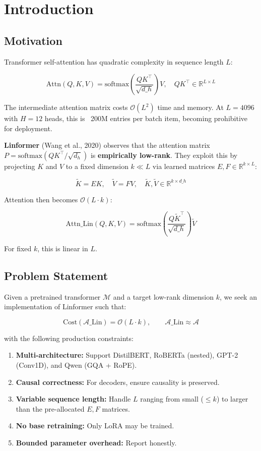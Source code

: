 \section{Introduction}

\subsection{Motivation}

Transformer self-attention has quadratic complexity in sequence length $L$:

\[
\text{Attn}(Q, K, V) = \text{softmax}\!\left(\frac{Q K^\top}{\sqrt{d\_h}}\right) V, 
\quad QK^\top \in \mathbb{R}^{L \times L}
\tag{1.1}
\]

The intermediate attention matrix costs $\mathcal{O}(L^2)$ time and memory. 
At $L = 4096$ with $H = 12$ heads, this is ~200M entries per batch item, 
becoming prohibitive for deployment.

\textbf{Linformer} (Wang et al., 2020) observes that the attention matrix 
$P = \text{softmax}(QK^\top/\sqrt{d_h})$ is \textbf{empirically low-rank}. They 
exploit this by projecting $K$ and $V$ to a fixed dimension $k \ll L$ via 
learned matrices $E, F \in \mathbb{R}^{k \times L}$:

\[
\tilde{K} = E K, \quad \tilde{V} = F V, \quad \tilde{K}, \tilde{V} \in \mathbb{R}^{k \times d\_h}
\tag{1.2}
\]

Attention then becomes $\mathcal{O}(L \cdot k)$:

\[
\text{Attn}\_\text{Lin}(Q, K, V) = \text{softmax}\!\left(\frac{Q \tilde{K}^\top}{\sqrt{d\_h}}\right) \tilde{V}
\tag{1.3}
\]

For fixed $k$, this is linear in $L$.

\subsection{Problem Statement}

Given a pretrained transformer $\mathcal{M}$ and a target low-rank dimension 
$k$, we seek an implementation of Linformer such that:

\[
\text{Cost}(\mathcal{A}\_\text{Lin}) = \mathcal{O}(L \cdot k), \qquad
\mathcal{A}\_\text{Lin} \approx \mathcal{A}
\tag{1.4}
\]

with the following production constraints:

\begin{enumerate}
\item \textbf{Multi-architecture:} Support DistilBERT, RoBERTa (nested), GPT-2
  (Conv1D), and Qwen (GQA + RoPE).
\item \textbf{Causal correctness:} For decoders, ensure causality is preserved.
\item \textbf{Variable sequence length:} Handle $L$ ranging from small ($\le$$k$) to
  larger than the pre-allocated $E, F$ matrices.
\item \textbf{No base retraining:} Only LoRA may be trained.
\item \textbf{Bounded parameter overhead:} Report honestly.

\end{enumerate}
